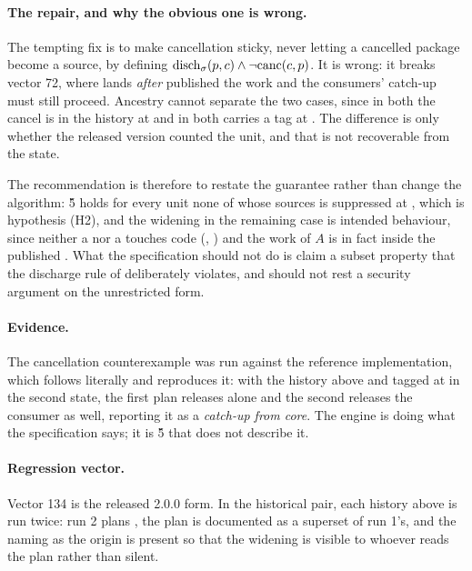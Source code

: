 \paragraph{The repair, and why the obvious one is wrong.} The tempting fix is
to make cancellation sticky, never letting a cancelled package become a source,
by defining $\mathrm{disch}_{\sigma}(p,c) \land \lnot\mathrm{canc}(c,p)$. It is wrong: it
breaks \SPEC{} vector 72, where  lands \emph{after}
 published the work and the consumers' catch-up must still proceed.
Ancestry cannot separate the two cases, since in both the cancel is in the
history at \Head{} and in both  carries a tag at \Head{}. The
difference is only whether the released version counted the unit, and that is
not recoverable from the state.

The recommendation is therefore to restate the guarantee rather than change the
algorithm: \G{5} holds for every unit none of whose sources is suppressed at
\Head{}, which is hypothesis (H2), and the widening in the remaining case is
intended behaviour, since neither a  nor a  touches
code (, ) and the work of $A$ is in fact inside the
published . What the specification should not do is claim a
subset property that the discharge rule of  deliberately violates,
and  should not rest a security argument on the unrestricted form.

\paragraph{Evidence.} The cancellation counterexample was run against the
reference implementation, which follows  literally and reproduces
it: with the history above and  tagged at \Head{} in the second
state, the first plan releases  alone and the second releases the
consumer as well, reporting it as a \emph{catch-up from core}. The engine is
doing what the specification says; it is \G{5} that does not describe it.

\paragraph{Regression vector.} Vector 134 is the released 2.0.0 form. In the historical pair, each history above is run twice: run 2
plans , the plan is documented as a superset of run 1's, and the
 naming  as the origin is present so that the widening is
visible to whoever reads the plan rather than silent.

